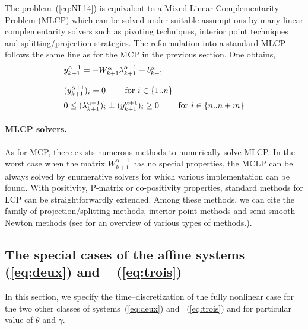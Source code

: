 The problem~(\ref{eq:NL14}) is equivalent to a Mixed Linear Complementarity Problem (MLCP) which can be solved under suitable assumptions by many linear complementarity solvers such as pivoting techniques, interior point techniques and splitting/projection strategies. The  reformulation into a standard MLCP follows the same line as for the MCP in the previous section. One obtains,
    \begin{equation}
      \begin{array}[l]{l}
        y^{\alpha+1}_{k+1} =   - W^{\alpha}_{k+1}  \lambda^{\alpha+1}_{k+1} + b^{\alpha}_{k+1}
        \\ \\
        (y^{\alpha+1}_{k+1})_i  = 0 \qquad \textrm{ for } i \in \{ 1..n\}\\[2mm]
        0 \leq  (\lambda^{\alpha+1}_{k+1})_i\perp (y^{\alpha+1}_{k+1})_i \geq 0 \qquad \textrm{ for } i \in \{ n..n+m\}\\
      \end{array}
      \label{eq:MLCP1} 
    \end{equation}

\paragraph{MLCP solvers.} As for MCP, there exists numerous methods to numerically solve MLCP. In the worst case when the matrix $W^{\alpha+1}_{k+1}$ has no special properties, the MCLP can be always solved by enumerative solvers for which various implementation can be found. With positivity, P-matrix  or co-positivity properties, standard methods for LCP\cite{Cottle.Pang.ea1992} can be straightforwardly extended. Among these methods, we can cite the family of projection/splitting methods, interior point methods and semi-smooth Newton methods (see \cite{acary2008} for an overview of various types of methods.).

\subsection{The special cases of the  affine  systems~ (\ref{eq:deux}) and ~ (\ref{eq:trois}) }
\label{Sec:Spec}


In this section, we specify the time--discretization of the fully nonlinear case for the two other classes of systems~(\ref{eq:deux}) and ~(\ref{eq:trois}) and for particular value of $\theta$ and $\gamma$. 




